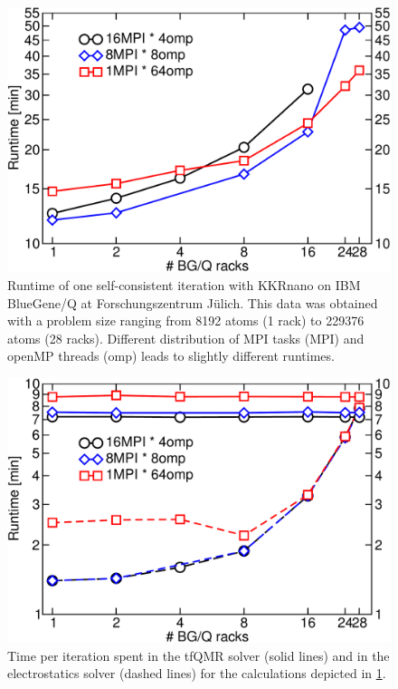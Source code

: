 \documentclass [a4paper, 12pt]{article}
\begin{document}
\begin{figure}[H]
\begin{center}
 \includegraphics[scale=0.45]{Figures/total_runtimes.pdf}
\end{center}
\caption{Runtime of one self-consistent iteration with KKRnano 
	on IBM BlueGene/Q at Forschungszentrum J{\"u}lich.
	This data was obtained with a problem size ranging from 8192 atoms (1 rack) to 229376 atoms (28 racks).
	Different distribution of MPI tasks (MPI) and openMP threads (omp) leads to slightly different runtimes.}
\label{fig:total_runtimes}
\end{figure}


\begin{figure}[H]
\begin{center}
 \includegraphics[scale=0.45]{Figures/combinedtfqmrelectrostatics.pdf}
\end{center}
\caption{Time per iteration spent in the tfQMR solver (solid lines) 
	and in the electrostatics solver (dashed lines) for the calculations depicted in
	\cref{fig:total_runtimes}.}
\label{fig:tfqmr_es_times}
\end{figure}
\end{document}
